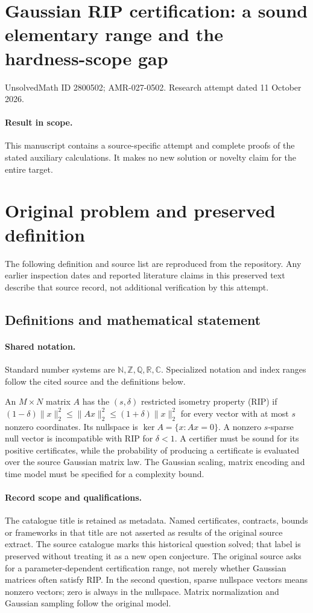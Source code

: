 \documentclass[11pt]{article}
\begin{document}
\section*{Gaussian RIP certification: a sound elementary range and the hardness-scope gap}
\noindent UnsolvedMath ID 2800502; AMR-027-0502. Research attempt dated 11 October 2026.
\paragraph{Result in scope.}This manuscript contains a source-specific attempt and complete proofs of the stated auxiliary calculations. It makes no new solution or novelty claim for the entire target.
\section{Original problem and preserved definition}
The following definition and source list are reproduced from the repository. Any earlier inspection dates and reported literature claims in this preserved text describe that source record, not additional verification by this attempt.
\subsection{Definitions and mathematical statement}

\paragraph{Shared notation.}Standard number systems are $\mathbb N,\mathbb Z,\mathbb Q,\mathbb R,\mathbb C$. Specialized notation and index ranges follow the cited source and the definitions below.


An $M\times N$ matrix $A$ has the $(s,\delta)$ restricted isometry property (RIP) if $(1-\delta)\lVert x\rVert_2^2\leq\lVert Ax\rVert_2^2\leq(1+\delta)\lVert x\rVert_2^2$ for every vector with at most $s$ nonzero coordinates. Its nullspace is $\ker A=\{x:Ax=0\}$. A nonzero $s$-sparse null vector is incompatible with RIP for $\delta<1$. A certifier must be sound for its positive certificates, while the probability of producing a certificate is evaluated over the source Gaussian matrix law. The Gaussian scaling, matrix encoding and time model must be specified for a complexity bound.
\paragraph{Record scope and qualifications.}
The catalogue title is retained as metadata. Named certificates, contracts, bounds or frameworks in that title are not asserted as results of the original source extract.
The source catalogue marks this historical question solved; that label is preserved without treating it as a new open conjecture. The original source asks for a parameter-dependent certification range, not merely whether Gaussian matrices often satisfy RIP. In the second question, sparse nullspace vectors means nonzero vectors; zero is always in the nullspace. Matrix normalization and Gaussian sampling follow the original model.
\end{document}
